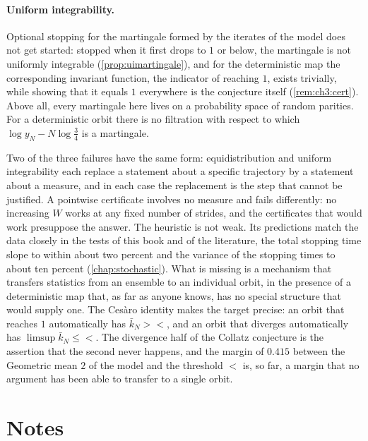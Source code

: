 \paragraph{Uniform integrability.} Optional stopping for the
martingale formed by the iterates of the model does not get started: stopped when it first drops to $1$ or below, the martingale is not uniformly integrable (\cref{prop:uimartingale}), and for the deterministic map the corresponding invariant function, the indicator of reaching $1$, exists trivially, while showing that it equals $1$ everywhere is the conjecture itself (\cref{rem:ch3:cert}). Above all, every martingale here lives on a
probability space of random parities. For a deterministic orbit there is no
filtration with respect to which $\log y_N-N\log\frac34$ is a martingale.

Two of the three failures have the same form: equidistribution and uniform integrability each replace a
statement about a specific trajectory by a statement about a measure, and in
each case the replacement is the step that cannot be justified. A pointwise certificate involves no measure and fails differently: no increasing $W$ works at any fixed number of strides, and the certificates that would work presuppose the answer. The heuristic
is not weak.
Its predictions match the data closely in the tests of this book and of the literature, the total stopping time slope to within about two percent and the variance of the stopping times to about ten percent (\cref{chap:stochastic}).
What is missing is a mechanism that transfers statistics from an ensemble to an
individual orbit, in the presence of a deterministic map that, as far as anyone
knows, has no special structure that would supply one. The Ces\`aro identity
makes the target precise: an orbit that reaches $1$ automatically has
$\bar k_N>\lt$, and an orbit that diverges automatically has
$\limsup\bar k_N\le\lt$. The divergence half of the Collatz conjecture is the
assertion that the second never happens, and the margin of $0.415$ between
the Geometric mean $2$ of the model and the threshold $\lt$ is, so far, a margin that no
argument has been able to transfer to a single orbit.

\section*{Notes}

